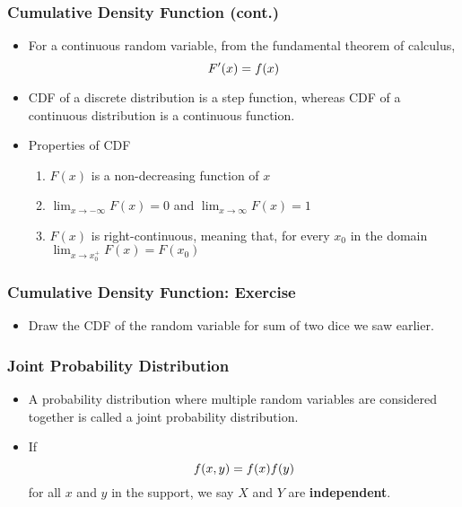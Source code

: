 \documentclass[pdflatex, 12pt]{beamer}
\begin{document}
\begin{frame}
\frametitle{Cumulative Density Function (cont.)}
\begin{itemize}
\item For a continuous random variable, from the fundamental theorem of calculus, 
 \begin{equation}
 F'(x) = f(x) \notag
 \end{equation}
\vspace{0.2cm}
\item CDF of a discrete distribution is a step function, whereas CDF of a continuous distribution is a continuous function.
\vspace{0.4cm}
\item Properties of CDF
 \begin{enumerate}
 \item $F(x)$ is a non-decreasing function of $x$
 \item $\lim_{x \to -\infty} F(x) = 0$ and $\lim_{x \to \infty} F(x) = 1$
 \item $F(x)$ is right-continuous, meaning that, for every $x_0$ in the domain $\lim_{x \to x_0^{+}} F(x) = F(x_0)$
 \end{enumerate}
\end{itemize}
\end{frame}

\begin{frame}
\frametitle{Cumulative Density Function: Exercise}
\begin{itemize}
\item Draw the CDF of the random variable for sum of two dice we saw earlier.
\end{itemize}
\end{frame}

\begin{frame}
\frametitle{Joint Probability Distribution}
\begin{itemize}
\item A probability distribution where multiple random variables are considered together is called a joint probability distribution.
\vspace{0.4cm}
\item If
 \begin{equation}
 f(x, y) = f(x)f(y) \notag 
 \end{equation}
for all $x$ and $y$ in the support, we say $X$ and $Y$ are \textbf{independent}.
\end{itemize}
\end{frame}
\end{document}
